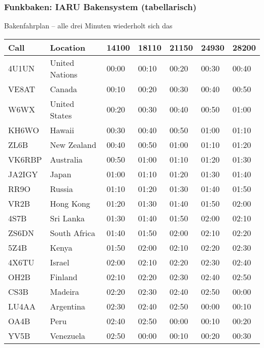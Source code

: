 \begin{frame}
  \frametitle{Funkbaken: IARU Bakensystem\hyperlink{refs}{\cite{ibp}} (tabellarisch)}

  \begin{center}
    \scriptsize

    {Bakenfahrplan -- alle drei Minuten wiederholt sich das}
    
    \begin{tabular}{|l|l|l|l|l|l|l|}\hline
      Call   & Location                          & 14100 & 18110 & 21150 & 24930 & 28200 \\ \hline \hline
      4U1UN  & United Nations                    & 00:00 & 00:10 & 00:20 & 00:30 & 00:40 \\ \hline
      VE8AT  & Canada                            & 00:10 & 00:20 & 00:30 & 00:40 & 00:50 \\ \hline
      W6WX   & United States                     & 00:20 & 00:30 & 00:40 & 00:50 & 01:00 \\ \hline
      KH6WO  & Hawaii                            & 00:30 & 00:40 & 00:50 & 01:00 & 01:10 \\ \hline
      ZL6B   & New Zealand                       & 00:40 & 00:50 & 01:00 & 01:10 & 01:20 \\ \hline
      VK6RBP & Australia                         & 00:50 & 01:00 & 01:10 & 01:20 & 01:30 \\ \hline
      JA2IGY & Japan                             & 01:00 & 01:10 & 01:20 & 01:30 & 01:40 \\ \hline
      RR9O   & Russia                            & 01:10 & 01:20 & 01:30 & 01:40 & 01:50 \\ \hline
      VR2B   & Hong Kong                         & 01:20 & 01:30 & 01:40 & 01:50 & 02:00 \\ \hline
      4S7B   & Sri Lanka                         & 01:30 & 01:40 & 01:50 & 02:00 & 02:10 \\ \hline
      ZS6DN  & South Africa                      & 01:40 & 01:50 & 02:00 & 02:10 & 02:20 \\ \hline
      5Z4B   & Kenya                             & 01:50 & 02:00 & 02:10 & 02:20 & 02:30 \\ \hline
      4X6TU  & Israel                            & 02:00 & 02:10 & 02:20 & 02:30 & 02:40 \\ \hline
      OH2B   & Finland                           & 02:10 & 02:20 & 02:30 & 02:40 & 02:50 \\ \hline
      CS3B   & Madeira                           & 02:20 & 02:30 & 02:40 & 02:50 & 00:00 \\ \hline
      LU4AA  & Argentina                         & 02:30 & 02:40 & 02:50 & 00:00 & 00:10 \\ \hline
      OA4B   & Peru                              & 02:40 & 02:50 & 00:00 & 00:10 & 00:20 \\ \hline
      YV5B   & Venezuela                         & 02:50 & 00:00 & 00:10 & 00:20 & 00:30 \\ \hline
    \end{tabular}
  \end{center}

\end{frame}


